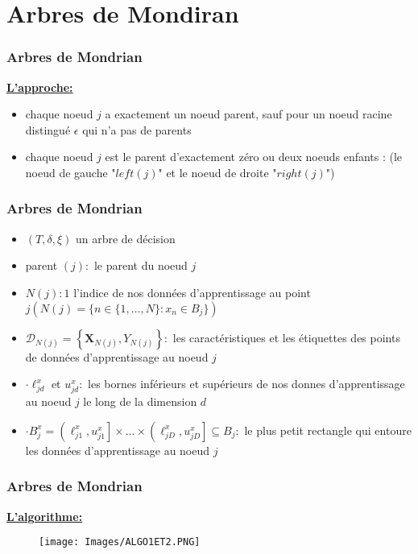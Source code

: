 \documentclass[unknownkeysallowed]{beamer}
\begin{document}
\section{Arbres de Mondiran}
\begin{frame}
\frametitle{Arbres de Mondrian}
\underline{\textbf{L'approche:}}
\begin{itemize}
    \item chaque noeud $j$ a exactement un noeud parent, sauf pour un noeud racine distingué $\epsilon$ qui n’a pas de parents
    \item chaque noeud $j$ est le parent d’exactement zéro ou deux noeuds enfants : (le noeud de gauche "$left(j)$" et le noeud de droite "$right(j)$")
\end{itemize}
\end{frame}

\begin{frame}
\frametitle{Arbres de Mondrian}

\begin{itemize}
    \item $(T, \delta, \xi)$ un arbre de décision
    \item  parent $(j):$ le parent du noeud $j$
    \item $N(j): 1$ l'indice de nos données d'apprentissage au point $j(N(j)=\{n \in\{1, \ldots, N\}: x_{n} \in B_{j}\})$
    \item  $\mathcal{D}_{N(j)}=\left\{\boldsymbol{X}_{N(j)}, Y_{N(j)}\right\}:$ les caractéristiques et les étiquettes des points de données d'apprentissage au noeud $j$
    \item $\cdot \ell_{j d}^{x}$ et $u_{j d}^{x}:$ les bornes inférieurs et supérieurs de nos donnes d'apprentissage au noeud $j$ le long de la dimension $d$
    \item $\cdot B_{j}^{x}=\left(\ell_{j 1}^{x}, u_{j 1}^{x}\right] \times \ldots \times\left(\ell_{j D}^{x}, u_{j D}^{x}\right] \subseteq B_{j}:$ le plus petit rectangle qui entoure les données d'apprentissage
au noeud $j$
    
\end{itemize}
\end{frame}

\begin{frame}
\frametitle{Arbres de Mondrian}
\underline{\textbf{L'algorithme:}}

\begin{figure}[H]
    \centering
    \texttt{[image: Images/ALGO1ET2.PNG]}
\end{figure}

\end{frame}
\end{document}
